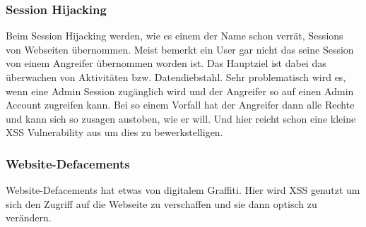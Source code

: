 \subsubsection{Session Hijacking}
Beim Session Hijacking werden, wie es einem der Name schon verrät, Sessions von Webseiten übernommen. Meist bemerkt ein User gar nicht das seine Session von einem Angreifer übernommen worden ist. Das Hauptziel ist dabei das überwachen von Aktivitäten bzw. Datendiebstahl. Sehr problematisch wird es, wenn eine Admin Session zugänglich wird und der Angreifer so auf einen Admin Account zugreifen kann. Bei so einem Vorfall hat der Angreifer dann alle Rechte und kann sich so zusagen austoben, wie er will. Und hier reicht schon eine kleine XSS Vulnerability aus um dies zu bewerkstelligen. 
\subsubsection{Website-Defacements}
Website-Defacements hat etwas von digitalem Graffiti. Hier wird XSS genutzt um sich den Zugriff auf die Webseite zu verschaffen und sie dann optisch zu verändern. 
